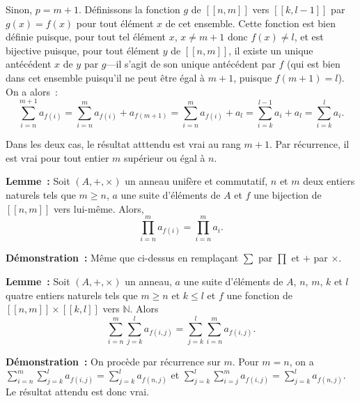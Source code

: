     Sinon, $p = m+1$. 
    Définissons la fonction $g$ de $[\![n, m]\!]$ vers $[\![k, l-1]\!]$ par $g(x) = f(x)$ pour tout élément $x$ de cet ensemble. 
    Cette fonction est bien définie puisque, pour tout tel élément $x$, $x \neq m+1$ donc $f(x) \neq l$, et est bijective puisque, pour tout élément $y$ de $[\![n, m]\!]$, il existe un unique antécédent $x$ de $y$ par $g$—il s'agit de son unique antécédent par $f$ (qui est bien dans cet ensemble puisqu'il ne peut être égal à $m+1$, puisque $f(m+1) = l$). 
    On a alors : 
    \begin{equation*}
        \sum_{i=n}^{m+1} a_{f(i)}
        = \sum_{i=n}^m a_{f(i)} + a_{f(m+1)}
        = \sum_{i=n}^m a_{f(i)} + a_l
        = \sum_{i=k}^{l-1} a_i + a_l
        = \sum_{i=k}^l a_i.
    \end{equation*}

    Dans les deux cas, le résultat atttendu est vrai au rang $m+1$.
    Par récurrence, il est vrai pour tout entier $m$ supérieur ou égal à $n$.

    \done

\medskip

\noindent\textbf{Lemme :} Soit $(A, +, \times)$ un anneau unifère et commutatif, $n$ et $m$ deux entiers naturels tels que $m \geq n$, $a$ une suite d'éléments de $A$ et $f$ une bijection de $[\![n, m]\!]$ vers lui-même. 
    Alors,
    \begin{equation*}
        \prod_{i=n}^m a_{f(i)} = \prod_{i=n}^m a_i.
    \end{equation*}

\medskip

\noindent\textbf{Démonstration :} Même que ci-dessus en remplaçant $\sum$ par $\prod$ et $+$ par $\times$.

\medskip

\noindent\textbf{Lemme :} Soit $(A, +, \times)$ un anneau, $a$ une suite d'éléments de $A$, $n$, $m$, $k$ et $l$ quatre entiers naturels tels que $m \geq n$ et $k \leq l$ et $f$ une fonction de $[\![n, m]\!] \times [\![k, l]\!]$ vers $\mathbb{N}$.
    Alors
    \begin{equation*}
        \sum_{i=n}^m \sum_{j=k}^l a_{f(i,j)}
             = \sum_{j=k}^l \sum_{i=n}^m a_{f(i,j)} .
    \end{equation*}

\medskip

\noindent\textbf{Démonstration :} On procède par récurrence sur $m$. 
    Pour $m = n$, on a $\sum_{i=n}^m \sum_{j=k}^l a_{f(i,j)} = \sum_{j=k}^l a_{f(n,j)}$ et $\sum_{j=k}^l \sum_{i=j}^m a_{f(i,j)} = \sum_{j=k}^l a_{f(n,j)}$.
    Le résultat attendu est donc vrai. 

